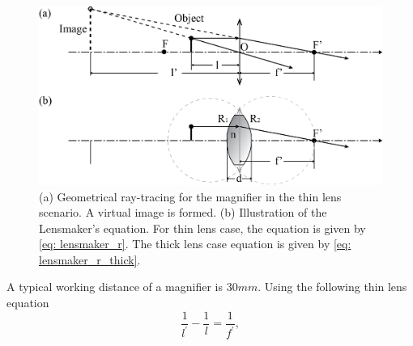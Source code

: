 \begin{figure}
    \centering
    \includegraphics[scale=0.58]{chapter-1/figures/geo_magnifier.png}
    \caption{(a) Geometrical ray-tracing for the magnifier in the thin lens scenario. A virtual image is formed. (b) Illustration of the Lensmaker's equation. For thin lens case, the equation is given by \ref{eq: lensmaker_r}. The thick lens case equation is given by \ref{eq: lensmaker_r_thick}.}
    \label{fig: geo_formulae}
\end{figure} 

A typical working distance of a magnifier is $30 mm$. Using the following thin lens equation 
\begin{equation} \label{eq: thinlensformula}
    \frac{1}{l^\prime} - \frac{1}{l} = \frac{1}{f^\prime},
\end{equation}

